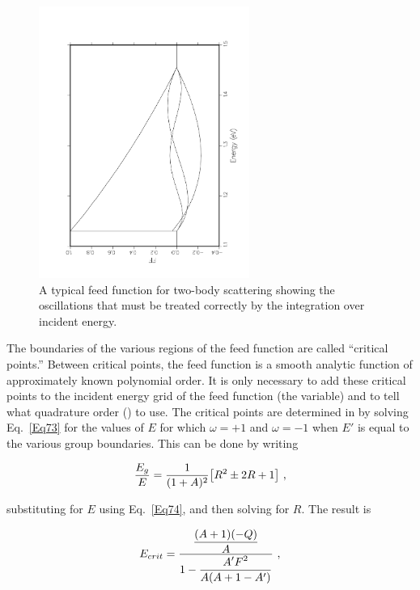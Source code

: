 \begin{figure}[t]\centering
\includegraphics[keepaspectratio, height=3.5in, angle=-90]{figs/groupr6ack}
\caption[Sample two-body scattering feed function]{A typical feed
function for two-body scattering showing the oscillations that must
be treated correctly by the integration over incident energy.}
\label{gr6}
\end{figure}

The boundaries of the various regions of the feed function are
called ``critical points.''  Between critical
points, the feed function is a smooth analytic function of
approximately known polynomial order.  It is only necessary
to add these critical points to the incident energy grid of
the feed function (the  variable) and to tell
 what quadrature order
() to use.  The critical points are determined in
 by solving Eq.~\ref{Eq73} for
the values of $E$ for which $\omega=+1$ and $\omega=-1$ when $E'$ is
equal to the various group boundaries.  This can be done by writing

  \begin{equation}
    {{E_g}\over{E}}=
    {{1}\over{(1+A)^2}}\bigl[ R^2\pm 2R+1\bigr]\,\,,
  \end{equation}
\vspace{0.5 pt}

\noindent
substituting for $E$ using Eq.~\ref{Eq74}, and then solving
for $R$.  The result is

  \begin{equation}
    E_{crit}={\displaystyle{ {{(A+1)(-Q)}\over{A}} }\over
    \displaystyle{1- {\displaystyle{A'F^2}\over{A(A+1-A')}} }}\,\,,
  \label{Eq79}
  \end{equation}
\vspace{0.5 pt}

